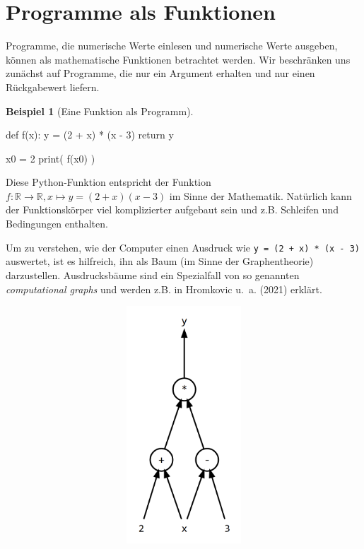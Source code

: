 \documentclass[
  letterpaper,
  DIV=11,
  oneside]{scrreprt}
\newenvironment{Shaded}{\begin{snugshade}}{\end{snugshade}}
\newcommand{\BuiltInTok}[1]{\textcolor[rgb]{0.00,0.23,0.31}{#1}}
\newcommand{\ControlFlowTok}[1]{\textcolor[rgb]{0.00,0.23,0.31}{#1}}
\newcommand{\DecValTok}[1]{\textcolor[rgb]{0.68,0.00,0.00}{#1}}
\newcommand{\KeywordTok}[1]{\textcolor[rgb]{0.00,0.23,0.31}{#1}}
\newcommand{\NormalTok}[1]{\textcolor[rgb]{0.00,0.23,0.31}{#1}}
\newcommand{\OperatorTok}[1]{\textcolor[rgb]{0.37,0.37,0.37}{#1}}
\theoremstyle{definition}
\theoremstyle{definition}
\newtheorem{example}{Beispiel}[chapter]
\theoremstyle{remark}
\begin{document}
\hypertarget{sec-ProgFunc}{%
\section{Programme als Funktionen}\label{sec-ProgFunc}}

Programme, die numerische Werte einlesen und numerische Werte ausgeben,
können als mathematische Funktionen betrachtet werden. Wir beschränken
uns zunächst auf Programme, die nur ein Argument erhalten und nur einen
Rückgabewert liefern.

\leavevmode{}%
\begin{example}[Eine Funktion als
Programm]\label{exm-FirstFunctionAsProgram}

\begin{Shaded}
\begin{Highlighting}[]
\KeywordTok{def}\NormalTok{ f(x):}
\NormalTok{    y }\OperatorTok{=}\NormalTok{ (}\DecValTok{2} \OperatorTok{+}\NormalTok{ x) }\OperatorTok{*}\NormalTok{ (x }\OperatorTok{{-}} \DecValTok{3}\NormalTok{)}
    \ControlFlowTok{return}\NormalTok{ y}

\NormalTok{x0 }\OperatorTok{=} \DecValTok{2}
\BuiltInTok{print}\NormalTok{( f(x0) )}
\end{Highlighting}
\end{Shaded}

Diese Python-Funktion entspricht der Funktion
\(f:\mathbb{R}\rightarrow\mathbb{R} , x \mapsto y=(2+x)(x-3)\) im Sinne
der Mathematik. Natürlich kann der Funktionskörper viel komplizierter
aufgebaut sein und z.B. Schleifen und Bedingungen enthalten.

Um zu verstehen, wie der Computer einen Ausdruck wie
\texttt{y\ =\ (2\ +\ x)\ *\ (x\ -\ 3)} auswertet, ist es hilfreich, ihn
als Baum (im Sinne der Graphentheorie) darzustellen. Ausdrucksbäume sind
ein Spezialfall von so genannten \emph{computational graphs} und werden
z.B. in Hromkovic u.~a. (2021) erklärt.

\begin{figure}

{\centering 

\begin{figure}[H]

{\centering \includegraphics[width=5.5in,height=3.5in]{./intro_files/figure-latex/dot-figure-1.png}

}
\end{figure}}
\end{figure}
\end{example}
\end{document}
